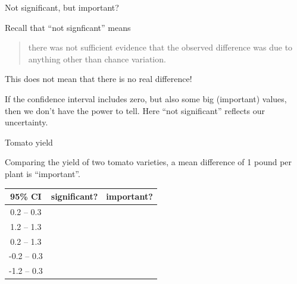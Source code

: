 \begin{frame}{Not significant, but important?}

    Recall that ``not signficant'' means
    \begin{quote}
        there was not sufficient evidence that the observed difference was due to anything other than chance variation.
    \end{quote}


    \vspace{2em}

    This does \alert{not} mean that there is no real difference!

    \vspace{2em}

    If the confidence interval includes zero, but also some big (important) values,
    then we don't have the \alert{power} to tell.  
    Here ``not significant'' reflects our uncertainty.



\end{frame}


\begin{frame}{Tomato yield}

    Comparing the yield of two tomato varieties,
    a mean difference of 1 pound per plant is ``important''.

    \vspace{2em}

    \begin{center}
    \begin{tabular}{c|cc}
        95\% CI & significant? & important? \\
        \hline
        0.2 -- 0.3 & & \\
        1.2 -- 1.3 & & \\
        0.2 -- 1.3 & & \\
        -0.2 -- 0.3 & & \\
        -1.2 -- 0.3 & & \\
        \hline
    \end{tabular}
    \end{center}


\end{frame}


